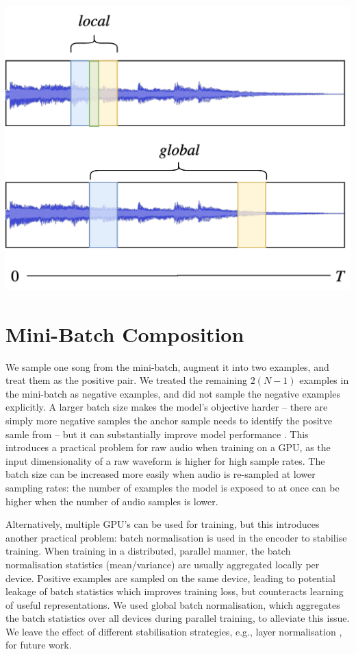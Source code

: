 \begin{marginfigure}
    \includegraphics[width=\textwidth]{figs/clmr_local_global.png}
    \caption{...}
    \label{fig:global_local}
\end{marginfigure}



\section{Mini-Batch Composition} %
We sample one song from the mini-batch, augment it into two examples, and treat them as the positive pair.
We treated the remaining $2(N-1)$ examples in the mini-batch as negative examples, and did not sample the negative examples explicitly.
A larger batch size makes the model's objective harder -- there are simply more negative samples the anchor sample needs to identify the positve samle from -- but it can substantially improve model performance \cite{chen_simple_2020}.
This introduces a practical problem for raw audio when training on a GPU, as the input dimensionality of a raw waveform is higher for high sample rates.
The batch size can be increased more easily when audio is re-sampled at lower sampling rates: the number of examples the model is exposed to at once can be higher when the number of audio samples is lower.

Alternatively, multiple GPU's can be used for training, but this introduces another practical problem: batch normalisation \cite{batch_normalisation} is used in the encoder to stabilise training.
When training in a distributed, parallel manner, the batch normalisation statistics (mean/variance) are usually aggregated locally per device.
Positive examples are sampled on the same device, leading to potential leakage of batch statistics which improves training loss, but counteracts learning of useful representations.
We used global batch normalisation, which aggregates the batch statistics over all devices during parallel training, to alleviate this issue. We leave the effect of different stabilisation strategies, e.g., layer normalisation \cite{henaff2019data}, for future work.


